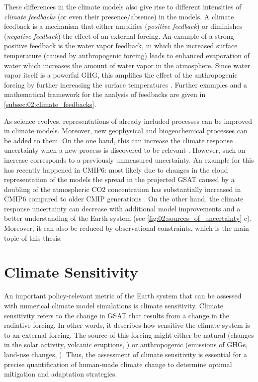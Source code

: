 These differences in the climate models also give rise to different intensities
of \emph{climate feedbacks} (or even their presence/absence) in the models. A
climate feedback is a mechanism that either amplifies (\emph{positive
  feedback}) or diminishes (\emph{negative feedback}) the effect of an external
forcing. An example of a strong positive feedback is the water vapor feedback,
in which the increased surface temperature (caused by anthropogenic forcing)
leads to enhanced evaporation of water which increases the amount of water
vapor in the atmosphere. Since water vapor itself is a powerful \ac{GHG}, this
amplifies the effect of the anthropogenic forcing by further increasing the
surface temperatures \autocite{Cubasch2013}. Further examples and a
mathematical framework for the analysis of feedbacks are given in
\cref{subsec:02:climate_feedbacks}.

As science evolves, representations of already included processes can be
improved in climate models. Moreover, new geophysical and biogeochemical
processes can be added to them. On the one hand, this can increase the climate
response uncertainty when a new process is discovered to be relevant
. However, such an
increase corresponds to a previously unmeasured uncertainty. An example for
this has recently happened in \acs{CMIP}6: most likely due to changes in the
cloud representation of the models the spread in the projected \ac{GSAT} caused
by a doubling of the atmospheric \ac{CO2} concentration has substantially
increased in \acs{CMIP}6 compared to older \ac{CMIP} generations
\autocite{Zelinka2020}. On the other hand, the climate response uncertainty can
decrease with additional model improvements and a better understanding of the
Earth system (see \cref{fig:02:sources_of_uncertainty}{\color{BrownRed} c}).
Moreover, it can also be reduced by observational constraints, which is the
main topic of this thesis.


\section{Climate Sensitivity}
\label{sec:02:climate_sensitivity}

An important policy-relevant metric of the Earth system that can be assessed
with numerical climate model simulations is climate sensitivity. Climate
sensitivity refers to the change in \ac{GSAT} that results from a change in the
radiative forcing. In other words, it describes how sensitive the climate
system is to an external forcing. The source of this forcing might either be
natural (changes in the solar activity, volcanic eruptions, \etc{}) or
anthropogenic (emissions of \acp{GHG}, land-use changes, \etc{}). Thus, the
assessment of climate sensitivity is essential for a precise quantification of
human-made climate change to determine optimal mitigation and adaptation
strategies.


